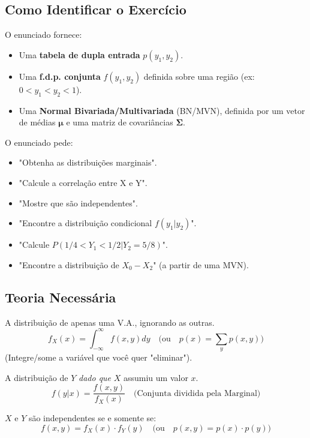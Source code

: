 \subsection{Como Identificar o Exercício}
O enunciado fornece:
\begin{itemize}
    \item Uma \textbf{tabela de dupla entrada} $p(y_1, y_2)$.
    \item Uma \textbf{f.d.p. conjunta} $f(y_1, y_2)$ definida sobre uma região (ex: $0 < y_1 < y_2 < 1$).
    \item Uma \textbf{Normal Bivariada/Multivariada} (BN/MVN), definida por um vetor de médias $\boldsymbol{\mu}$ e uma matriz de covariâncias $\boldsymbol{\Sigma}$.
\end{itemize}
O enunciado pede:
\begin{itemize}
    \item "Obtenha as distribuições marginais".
    \item "Calcule a correlação entre X e Y".
    \item "Mostre que são independentes".
    \item "Encontre a distribuição condicional $f(y_1 | y_2)$".
    \item "Calcule $P(1/4 < Y_1 < 1/2 | Y_2 = 5/8)$".
    \item "Encontre a distribuição de $X_0 - X_2$" (a partir de uma MVN).
\end{itemize}

\subsection{Teoria Necessária}
\begin{definicao}
A distribuição de apenas uma V.A., ignorando as outras.
$$ f_X(x) = \int_{-\infty}^{\infty} f(x,y) dy \quad \text{(ou} \quad p(x) = \sum_{y} p(x,y) \text{)} $$
(Integre/some a variável que você quer "eliminar").
\end{definicao}

\begin{definicao}
A distribuição de $Y$ \textit{dado que} $X$ assumiu um valor $x$.
$$ f(y|x) = \frac{f(x,y)}{f_X(x)} \quad \text{(Conjunta dividida pela Marginal)} $$
\end{definicao}

\begin{definicao}[Independência]
$X$ e $Y$ são independentes se e somente se:
$$ f(x,y) = f_X(x) \cdot f_Y(y) \quad \text{(ou} \quad p(x,y) = p(x) \cdot p(y) \text{)} $$
\end{definicao}

